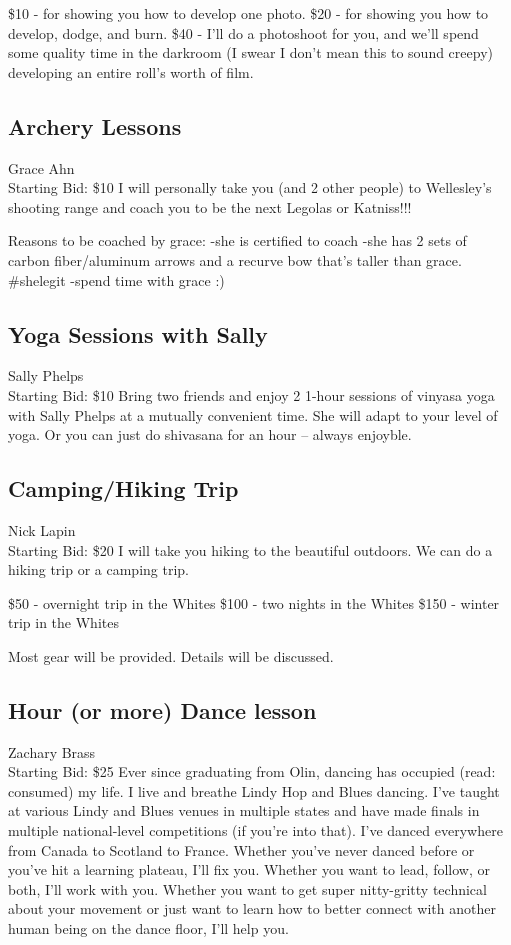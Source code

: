 \documentclass[11pt]{article}
\begin{document}
\$10 - for showing you how to develop one photo.
\$20 - for showing you how to develop, dodge, and burn.
\$40 - I'll do a photoshoot for you, and we'll spend some quality time in the darkroom (I swear I don't mean this to sound creepy) developing an entire roll's worth of film.
\subsection{Archery Lessons}
Grace Ahn
\\
Starting Bid: \$10
\newline
I will personally take you (and 2 other people) to Wellesley's shooting range and coach you to be the next Legolas or Katniss!!! 

Reasons to be coached by grace:
-she is certified to coach 
-she has 2 sets of carbon fiber/aluminum arrows and a recurve bow that's taller than grace. \#shelegit
-spend time with grace :)
\subsection{Yoga Sessions with Sally}
Sally Phelps
\\
Starting Bid: \$10
\newline
Bring two friends and enjoy 2  1-hour sessions of vinyasa yoga with Sally Phelps at a mutually convenient time.  She will adapt to your level of yoga.  Or you can just do shivasana for an hour – always enjoyble.
\subsection{Camping/Hiking Trip}
Nick Lapin
\\
Starting Bid: \$20
\newline
I will take you hiking to the beautiful outdoors. We can do a hiking trip or a camping trip. 

\$50 - overnight trip in the Whites
\$100 - two nights in the Whites
\$150 - winter trip in the Whites

Most gear will be provided. Details will be discussed.
\subsection{Hour (or more) Dance lesson}
Zachary Brass
\\
Starting Bid: \$25
\newline
Ever since graduating from Olin, dancing has occupied (read: consumed) my life. I live and breathe Lindy Hop and Blues dancing. I've taught at various Lindy and Blues venues in multiple states and have made finals in multiple national-level competitions (if you're into that). I've danced everywhere from Canada to Scotland to France. Whether you've never danced before or you've hit a learning plateau, I'll fix you. Whether you want to lead, follow, or both, I'll work with you. Whether you want to get super nitty-gritty technical about your movement or just want to learn how to better connect with another human being on the dance floor, I'll help you.
\end{document}
